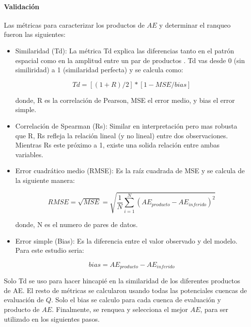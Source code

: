 \documentclass[12pt]{article}
\begin{document}
\paragraph{Validación}\mbox{}

Las métricas para caracterizar los productos de $AE$ y determinar el ranqueo fueron las siguientes:

\begin{itemize}

	\item Similaridad (Td): La métrica Td explica las diferencias tanto en el patrón espacial como en la amplitud entre un par de productos \citep{Tian2017}. Td vas desde 0 (sin similiridad) a 1 (similaridad perfecta) y se calcula como:
	
	\begin{equation}
    Td = [(1 + R) / 2]*[1 - MSE/bias]
    \end{equation}
    
    donde, R es la correlación de Pearson, MSE el error medio, y bias el error simple.
    

	\item Correlación de Spearman (Rs): Similar en interpretación pero mas robusta que R, Rs refleja la relación lineal (y no lineal) entre dos observaciones. Mientras Rs este próximo a 1, existe una solida relación entre ambas variables.
	
	\item Error cuadrático medio (RMSE): Es la raíz cuadrada de MSE y se calcula de la siguiente manera:
	
    \begin{equation}
        RMSE = \sqrt{MSE} = \sqrt{\frac{1}{N} \sum_{i=1}^{N}(AE_{producto}-AE_{inferido})^{2}}
    \end{equation}
    
    donde, N es el numero de pares de datos.
    
	\item Error simple (Bias): Es la diferencia entre el valor observado y del modelo. Para este estudio seria:
	
    \begin{equation}
        bias = AE_{producto}-AE_{inferido}
    \end{equation}
	
\end{itemize}

Solo Td se uso para hacer hincapié en la similaridad de los diferentes productos de AE. El resto de métricas se calcularon usando todas las potenciales cuencas de evaluación de $Q$. Solo el bias se calculo para cada cuenca de evaluación y producto de $AE$. Finalmente, se renquea y selecciona el mejor $AE$, para ser utilizado en los siguientes pasos.
\end{document}
